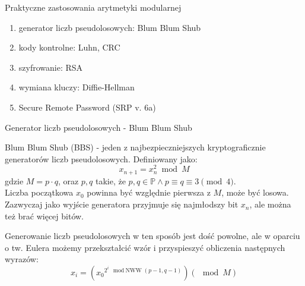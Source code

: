 \documentclass[polish,envcountsect,10pt]{beamer}
\begin{document}
\begin{frame}{Praktyczne zastosowania arytmetyki modularnej}
    \begin{enumerate}
        \item generator liczb pseudolosowych: Blum Blum Shub
        \item kody kontrolne: Luhn, CRC
        \item szyfrowanie: RSA
        \item wymiana kluczy: Diffie-Hellman
        \item Secure Remote Password (SRP v. 6a)
    \end{enumerate}
\end{frame}

\begin{frame}{Generator liczb pseudolosowych - Blum Blum Shub}
    \begin{definition}
        Blum Blum Shub (BBS) - jeden z najbezpieczniejszych kryptograficznie generatorów liczb pseudolosowych. Definiowany jako:
        \[ x_{n+1}=x_{n}^{2} \bmod{M} \] gdzie $M = p \cdot q$, oraz $p, q$ takie, że $p, q \in \mathbb{P} \land p \equiv q \equiv 3 \pmod{4}$.
        \\
        Liczba początkowa $x_0$ powinna być względnie pierwsza z $M$, może być losowa.
        Zazwyczaj jako wyjście generatora przyjmuje się najmłodszy bit $x_n$, ale można też brać więcej bitów.
    \end{definition}
    Generowanie liczb pseudolosowych w ten sposób jest dość powolne, ale w oparciu o tw. Eulera możemy przekształcić wzór i przyspieszyć obliczenia następnych wyrazów:
    \[ x_{i} = ({x_{0}}^{ 2^{i}\mod\text{NWW}(p-1, q-1) })(\mod M) \]
\end{frame}

%
\end{document}
